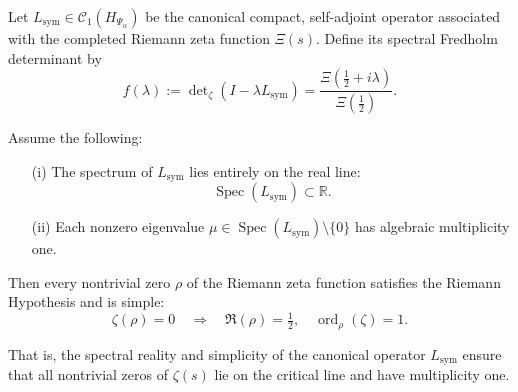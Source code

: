 \begin{proposition}
\label{prop:spectrum_reality_implies_rh_multiplicity}
Let \( L_{\mathrm{sym}} \in \mathcal{C}_1(H_{\Psi_\alpha}) \) be the canonical compact, self-adjoint operator associated with the completed Riemann zeta function \( \Xi(s) \). Define its spectral Fredholm determinant by
\[
f(\lambda) := \det\nolimits_\zeta(I - \lambda L_{\mathrm{sym}}) = \frac{\Xi\left( \tfrac{1}{2} + i\lambda \right)}{\Xi\left( \tfrac{1}{2} \right)}.
\]

Assume the following:
\begin{enumerate}
  \item[\textnormal{(i)}] The spectrum of \( L_{\mathrm{sym}} \) lies entirely on the real line:
  \[
  \operatorname{Spec}(L_{\mathrm{sym}}) \subset \mathbb{R}.
  \]
  \item[\textnormal{(ii)}] Each nonzero eigenvalue \( \mu \in \operatorname{Spec}(L_{\mathrm{sym}}) \setminus \{0\} \) has algebraic multiplicity one.
\end{enumerate}

Then every nontrivial zero \( \rho \) of the Riemann zeta function satisfies the Riemann Hypothesis and is simple:
\[
\zeta(\rho) = 0 \quad \Longrightarrow \quad \Re(\rho) = \tfrac{1}{2}, \quad \operatorname{ord}_\rho(\zeta) = 1.
\]

\medskip
\noindent
That is, the spectral reality and simplicity of the canonical operator \( L_{\mathrm{sym}} \) ensure that all nontrivial zeros of \( \zeta(s) \) lie on the critical line and have multiplicity one.
\end{proposition}
